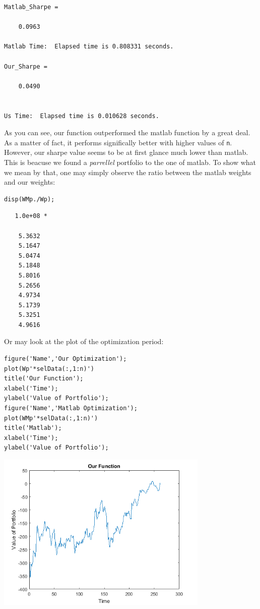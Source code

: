 \documentclass[12pt]{article}
\begin{document}
        \color{lightgray} \begin{verbatim}
Matlab_Sharpe =

    0.0963

Matlab Time:  Elapsed time is 0.808331 seconds.

Our_Sharpe =

    0.0490


Us Time:  Elapsed time is 0.010628 seconds.
\end{verbatim} \color{black}
    \begin{par}
As you can see, our function outperformed the matlab function by a great deal. As a matter of fact, it performs significally better with higher values of \texttt{n}. However, our sharpe value seems to be at first glance much lower than matlab. This is beacuse we found a \textit{parrellel} portfolio to the one of matlab. To show what we mean by that, one may simply observe the ratio between the matlab weights and our weights:
\end{par} \vspace{1em}
\begin{verbatim}
disp(WMp./Wp);
\end{verbatim}

        \color{lightgray} \begin{verbatim}   1.0e+08 *

    5.3632
    5.1647
    5.0474
    5.1848
    5.8016
    5.2656
    4.9734
    5.1739
    5.3251
    4.9616

\end{verbatim} \color{black}
    \begin{par}
Or may look at the plot of the optimization period:
\end{par} \vspace{1em}
\begin{verbatim}
figure('Name','Our Optimization');
plot(Wp'*selData(:,1:n)')
title('Our Function');
xlabel('Time');
ylabel('Value of Portfolio');
figure('Name','Matlab Optimization');
plot(WMp'*selData(:,1:n)')
title('Matlab');
xlabel('Time');
ylabel('Value of Portfolio');
\end{verbatim}

\includegraphics [width=4in]{testing_01.png}
\end{document}
